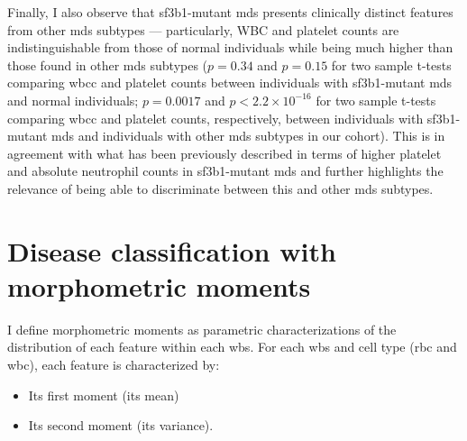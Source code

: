 \begin{figure}[!ht]
    \label{fig:mds-hb}
\end{figure}

\begin{figure}[!ht]
    \label{fig:mds-plt}
\end{figure}

Finally, I also observe that \ac{sf3b1}-mutant \ac{mds} presents clinically distinct features from other \ac{mds} subtypes --- particularly, WBC and platelet counts are indistinguishable from those of normal individuals while being much higher than those found in other \ac{mds} subtypes ($p=0.34$ and $p=0.15$ for two sample t-tests comparing \ac{wbcc} and platelet counts between individuals with \ac{sf3b1}-mutant \ac{mds} and normal individuals; $p=0.0017$ and $p<2.2 \times 10^{-16}$ for two sample t-tests comparing \ac{wbcc} and platelet counts, respectively, between individuals with \ac{sf3b1}-mutant \ac{mds} and individuals with other \ac{mds} subtypes in our cohort). This is in agreement with what has been previously described in terms of higher platelet and absolute neutrophil counts in \ac{sf3b1}-mutant \ac{mds} \cite{Malcovati2015-tz,Malcovati2020-no} and further highlights the relevance of being able to discriminate between this and other \ac{mds} subtypes. 

\section{Disease classification with morphometric moments}

I define morphometric moments as parametric characterizations of the distribution of each feature within each \ac{wbs}. For each \ac{wbs} and cell type (\ac{rbc} and \ac{wbc}), each feature is characterized by:

\begin{itemize}
    \item Its first moment (its mean)
    \item Its second moment (its variance).
\end{itemize}

